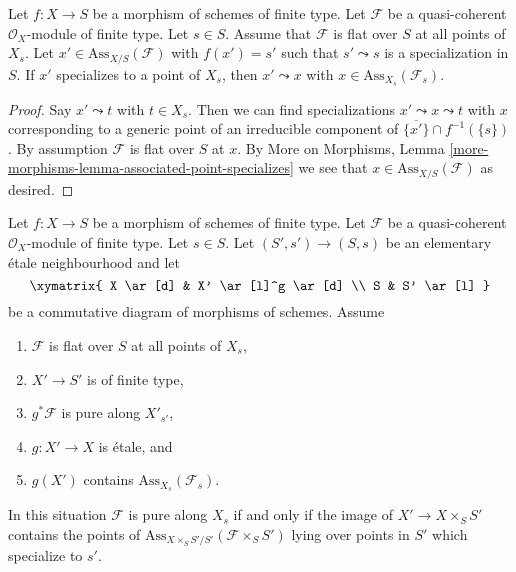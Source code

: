\begin{lemma}
\label{lemma-associated-point-specializes}
Let $f : X \to S$ be a morphism of schemes of finite type.
Let $\mathcal{F}$ be a quasi-coherent $\mathcal{O}_X$-module of finite type.
Let $s \in S$.
Assume that $\mathcal{F}$ is flat over $S$ at all points of $X_s$.
Let $x' \in \text{Ass}_{X/S}(\mathcal{F})$ with $f(x') = s'$
such that $s' \leadsto s$ is a specialization in $S$. If
$x'$ specializes to a point of $X_s$, then $x' \leadsto x$
with $x \in \text{Ass}_{X_s}(\mathcal{F}_s)$.
\end{lemma}

\begin{proof}
Say $x' \leadsto t$ with $t \in X_s$. Then we can find specializations
$x' \leadsto x \leadsto t$ with $x$ corresponding to a generic
point of an irreducible component of
$\overline{\{x'\}} \cap f^{-1}(\{s\})$. By assumption $\mathcal{F}$ is flat
over $S$ at $x$. By More on Morphisms, Lemma
\ref{more-morphisms-lemma-associated-point-specializes}
we see that $x \in \text{Ass}_{X/S}(\mathcal{F})$ as desired.
\end{proof}

\begin{lemma}
\label{lemma-criterion}
Let $f : X \to S$ be a morphism of schemes of finite type.
Let $\mathcal{F}$ be a quasi-coherent $\mathcal{O}_X$-module
of finite type. Let $s \in S$. Let $(S', s') \to (S, s)$ be an
elementary \'etale neighbourhood and let
$$
\xymatrix{
X \ar[d] & X' \ar[l]^g \ar[d] \\
S & S' \ar[l]
}
$$
be a commutative diagram of morphisms of schemes. Assume
\begin{enumerate}
\item $\mathcal{F}$ is flat over $S$ at all points of $X_s$,
\item $X' \to S'$ is of finite type,
\item $g^*\mathcal{F}$ is pure along $X'_{s'}$,
\item $g : X' \to X$ is \'etale, and
\item $g(X')$ contains $\text{Ass}_{X_s}(\mathcal{F}_s)$.
\end{enumerate}
In this situation $\mathcal{F}$ is pure along $X_s$ if and only
if the image of $X' \to X \times_S S'$ contains the points of
$\text{Ass}_{X \times_S S'/S'}(\mathcal{F} \times_S S')$
lying over points in $S'$ which specialize to $s'$.
\end{lemma}

